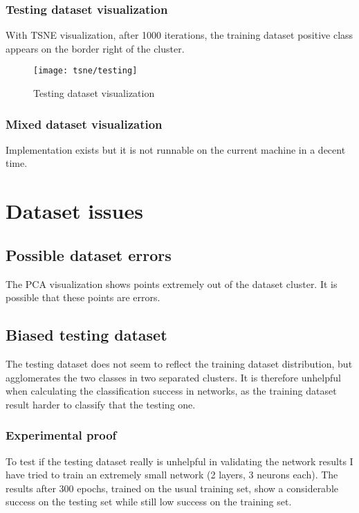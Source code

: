 \subsection{Testing dataset visualization}
With TSNE visualization, after 1000 iterations, the training dataset positive class appears on the border right of the cluster.

\begin{figure}
	\texttt{[image: tsne/testing]}
	\caption{Testing dataset visualization}
\end{figure}

\subsection{Mixed dataset visualization}
Implementation exists but it is not runnable on the current machine in a decent time.

\chapter{Dataset issues}

\section{Possible dataset errors}
The PCA visualization shows points extremely out of the dataset cluster. It is possible that these points are errors.

\section{Biased testing dataset}
The testing dataset does not seem to reflect the training dataset distribution, but agglomerates the two classes in two separated clusters. It is therefore unhelpful when calculating the classification success in networks, as the training dataset result harder to classify that the testing one.

\subsection{Experimental proof}
To test if the testing dataset really is unhelpful in validating the network results I have tried to train an extremely small network (2 layers, 3 neurons each). The results after 300 epochs, trained on the usual training set, show a considerable success on the testing set while still low success on the training set.

